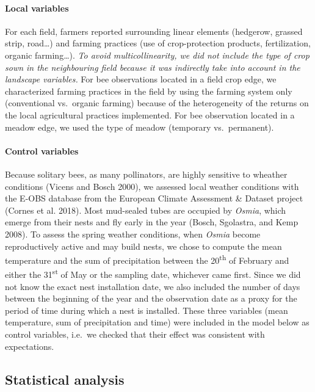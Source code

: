\documentclass[smallextended]{svjour3}       %
\begin{document}
\hypertarget{local-variables}{%
\paragraph{Local variables}\label{local-variables}}

For each field, farmers reported surrounding linear elements (hedgerow,
grassed strip, road\ldots) and farming practices (use of crop-protection
products, fertilization, organic farming\ldots). \emph{To avoid
multicollinearity, we did not include the type of crop sown in the
neighbouring field because it was indirectly take into account in the
landscape variables.} For bee observations located in a field crop edge,
we characterized farming practices in the field by using the farming
system only (conventional vs.~organic farming) because of the
heterogeneity of the returns on the local agricultural practices
implemented. For bee observation located in a meadow edge, we used the
type of meadow (temporary vs.~permanent).

\hypertarget{control-variables}{%
\paragraph{Control variables}\label{control-variables}}

Because solitary bees, as many pollinators, are highly sensitive to
wheather conditions (Vicens and Bosch 2000), we assessed local weather
conditions with the E-OBS database from the European Climate Assessment
\& Dataset project (Cornes et al. 2018). Most mud-sealed tubes are
occupied by \emph{Osmia}, which emerge from their nests and fly early in
the year (Bosch, Sgolastra, and Kemp 2008). To assess the spring weather
conditions, when \emph{Osmia} become reproductively active and may build
nests, we chose to compute the mean temperature and the sum of
precipitation between the 20\textsuperscript{th} of February and either
the 31\textsuperscript{st} of May or the sampling date, whichever came
first. Since we did not know the exact nest installation date, we also
included the number of days between the beginning of the year and the
observation date as a proxy for the period of time during which a nest
is installed. These three variables (mean temperature, sum of
precipitation and time) were included in the model below as control
variables, i.e.~we checked that their effect was consistent with
expectations.

\hypertarget{statistical-analysis}{%
\subsection{Statistical analysis}\label{statistical-analysis}}
\end{document}
